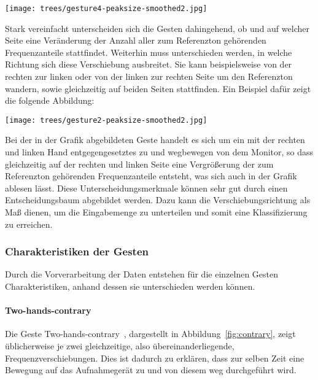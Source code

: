 \begin{center}
  \texttt{[image: trees/gesture4-peaksize-smoothed2.jpg]}
\end{center}


Stark vereinfacht unterscheiden sich die Gesten dahingehend, ob und auf welcher Seite 
eine Veränderung der Anzahl aller zum Referenzton gehörenden Frequenzanteile stattfindet. 
Weiterhin muss unterschieden werden, in welche Richtung sich diese Verschiebung ausbreitet. 
Sie kann beispielsweise von der rechten zur linken oder von der linken zur rechten Seite 
um den Referenzton wandern, sowie gleichzeitig auf beiden Seiten stattfinden. 
Ein Beispiel dafür zeigt die folgende Abbildung:

\begin{center} 
\label{fig:contrary}
  \texttt{[image: trees/gesture2-peaksize-smoothed2.jpg]}
\end{center}

Bei der in der Grafik abgebildeten Geste handelt es sich um ein mit der rechten und linken Hand entgegengesetztes zu und 
wegbewegen von dem Monitor, so dass gleichzeitig auf der rechten und linken Seite eine Vergrößerung der 
zum Referenzton gehörenden Frequenzanteile entsteht, was sich auch in der Grafik ablesen lässt.
Diese Unterscheidungsmerkmale können sehr gut durch einen Entscheidungsbaum abgebildet werden. 
Dazu kann die Verschiebungsrichtung als Maß dienen, um die Eingabemenge zu unterteilen und 
somit eine Klassifizierung zu erreichen.

\subsubsection{Charakteristiken der Gesten} \label{charakteristiken}
Durch die Vorverarbeitung der Daten entstehen für die einzelnen Gesten Charakteristiken, anhand dessen sie unterschieden werden können. 



\paragraph*{Two-hands-contrary}
Die Geste \glqq Two-hands-contrary\grqq\ , dargestellt in Abbildung~\ref{fig:contrary}, zeigt üblicherweise je zwei gleichzeitige, also übereinanderliegende, Frequenzverschiebungen. Dies ist dadurch zu erklären, dass zur selben Zeit eine Bewegung auf das Aufnahmegerät zu und von diesem weg durchgeführt wird.


